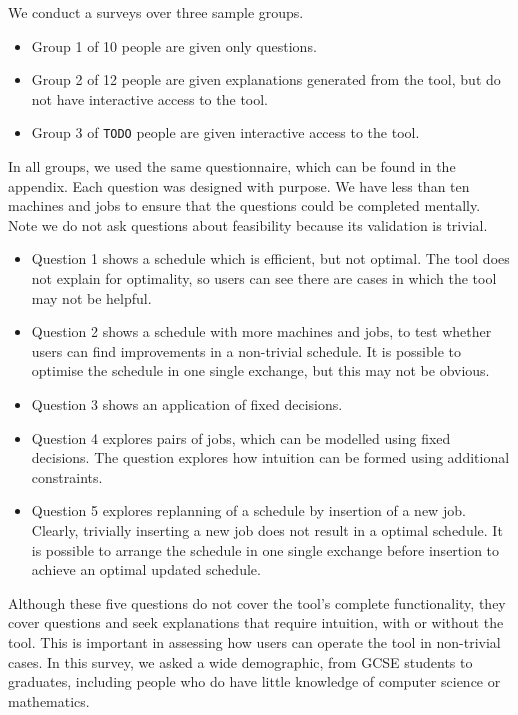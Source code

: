 We conduct a surveys over three sample groups.

\begin{itemize}
	\item Group 1 of 10 people are given only questions.
	\item Group 2 of 12 people are given explanations generated from the tool, but do not have interactive access to the tool.
	\item Group 3 of \verb|TODO| people are given interactive access to the tool.
\end{itemize}

In all groups, we used the same questionnaire, which can be found in the appendix. Each question was designed with purpose. We have less than ten machines and jobs to ensure that the questions could be completed mentally. Note we do not ask questions about feasibility because its validation is trivial. 

\begin{itemize}
	\item Question 1 shows a schedule which is efficient, but not optimal. The tool does not explain for optimality, so users can see there are cases in which the tool may not be helpful.
	\item Question 2 shows a schedule with more machines and jobs, to test whether users can find improvements in a non-trivial schedule. It is possible to optimise the schedule in one single exchange, but this may not be obvious.
	\item Question 3 shows an application of fixed decisions.
	\item Question 4 explores pairs of jobs, which can be modelled using fixed decisions. The question explores how intuition can be formed using additional constraints.
	\item Question 5 explores replanning of a schedule by insertion of a new job. Clearly, trivially inserting a new job does not result in a optimal schedule. It is possible to arrange the schedule in one single exchange before insertion to achieve an optimal updated schedule.
\end{itemize}

Although these five questions do not cover the tool's complete functionality, they cover questions and seek explanations that require intuition, with or without the tool. This is important in assessing how users can operate the tool in non-trivial cases. In this survey, we asked a wide demographic, from GCSE students to graduates, including people who do have little knowledge of computer science or mathematics. 

